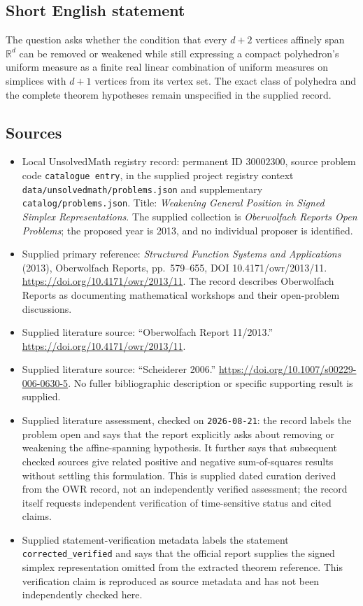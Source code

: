 \documentclass[11pt]{article}
\newcommand{\R}{\mathbb{R}}
\begin{document}
\subsection{Short English statement}
The question asks whether the condition that every \(d+2\) vertices affinely span \(\R^d\) can be removed or weakened while still expressing a compact polyhedron's uniform measure as a finite real linear combination of uniform measures on simplices with \(d+1\) vertices from its vertex set. The exact class of polyhedra and the complete theorem hypotheses remain unspecified in the supplied record.
\subsection{Sources}
\begin{itemize}
\item Local UnsolvedMath registry record: permanent ID \(30002300\), source problem code \texttt{catalogue entry}, in the supplied project registry context \texttt{data/unsolvedmath/problems.json} and supplementary \texttt{catalog/problems.json}. Title: \emph{Weakening General Position in Signed Simplex Representations}. The supplied collection is \emph{Oberwolfach Reports Open Problems}; the proposed year is 2013, and no individual proposer is identified.
\item Supplied primary reference: \emph{Structured Function Systems and Applications} (2013), Oberwolfach Reports, pp.\ 579--655, DOI 10.4171/owr/2013/11. \url{https://doi.org/10.4171/owr/2013/11}. The record describes Oberwolfach Reports as documenting mathematical workshops and their open-problem discussions.
\item Supplied literature source: ``Oberwolfach Report 11/2013.'' \url{https://doi.org/10.4171/owr/2013/11}.
\item Supplied literature source: ``Scheiderer 2006.'' \url{https://doi.org/10.1007/s00229-006-0630-5}. No fuller bibliographic description or specific supporting result is supplied.
\item Supplied literature assessment, checked on \texttt{2026-08-21}: the record labels the problem open and says that the report explicitly asks about removing or weakening the affine-spanning hypothesis. It further says that subsequent checked sources give related positive and negative sum-of-squares results without settling this formulation. This is supplied dated curation derived from the OWR record, not an independently verified assessment; the record itself requests independent verification of time-sensitive status and cited claims.
\item Supplied statement-verification metadata labels the statement \texttt{corrected\_verified} and says that the official report supplies the signed simplex representation omitted from the extracted theorem reference. This verification claim is reproduced as source metadata and has not been independently checked here.
\end{itemize}
\end{document}
